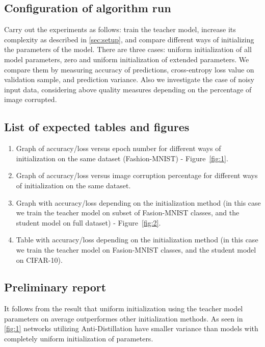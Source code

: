 \documentclass[80pt]{article}
\begin{document}
\subsection{Configuration of algorithm run}

Carry out the experiments as follows: train the teacher model, increase its complexity as described in \autoref{sec:setup}, and compare different ways of initializing the parameters of the model. There are three cases: uniform initialization of all model parameters, zero and uniform initialization of extended parameters. We compare them by measuring accuracy of predictions, cross-entropy loss value on validation sample, and prediction variance. Also we investigate the case of noisy input data, considering above quality measures depending on the percentage of image corrupted.

\subsection{List of expected tables and figures}

\begin{enumerate}
    \item Graph of accuracy/loss versus epoch number for different ways of initialization on the same dataset (Fashion-MNIST) - Figure~\ref{fig:1}.
    \item Graph of accuracy/loss versus image corruption percentage for different ways of initialization on the same dataset.
    \item Graph with accuracy/loss depending on the initialization method (in this case we train the teacher model on subset of Fasion-MNIST classes, and the student model on full dataset) - Figure~\ref{fig:2}.
    \item Table with accuracy/loss depending on the initialization method (in this case we train the teacher model on Fasion-MNIST classes, and the student model on CIFAR-10).
\end{enumerate}

\subsection{Preliminary report}

It follows from the result that uniform initialization using the teacher model parameters on average outperformes other initialization methods. As seen in \ref{fig:1} networks utilizing Anti-Distillation have smaller variance than models with completely uniform initialization of parameters.
\end{document}
